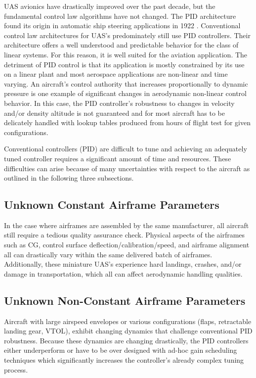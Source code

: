 \ac{UAS} avionics have drastically improved over the past decade, but the fundamental control law algorithms have not changed.  The \ac{PID} architecture found its origin in automatic ship steering applications in 1922 \cite{minorsky1922pid}.  Conventional control law architectures for \ac{UAS}'s predominately still use \ac{PID} controllers.  Their architecture offers a well understood and predictable behavior for the class of linear systems.  For this reason, it is well suited for the aviation application.  The detriment of \ac{PID} control is that its application is mostly constrained by its use on a linear plant and most aerospace applications are non-linear and time varying.   An aircraft's control authority that increases proportionally to dynamic pressure is one example of significant changes in aerodynamic non-linear control behavior.  In this case, the \ac{PID} controller's robustness to changes in velocity and/or density altitude is not guaranteed and for most aircraft has to be delicately handled with lookup tables produced from hours of flight test for given configurations.

Conventional controllers (\ac{PID}) are difficult to tune and achieving an adequately tuned controller requires a significant amount of time and resources.  These difficulties can arise because of many uncertainties with respect to the aircraft as outlined in the following three subsections.

\subsection{Unknown Constant Airframe Parameters}
In the case where airframes are assembled by the same manufacturer, all aircraft still require a tedious quality assurance check.  Physical aspects of the airframes such as \ac{CG}, control surface deflection/calibration/speed, and airframe alignment all can drastically vary within the same delivered batch of airframes.  Additionally, these miniature \ac{UAS}'s experience hard landings, crashes, and/or damage in transportation, which all can affect aerodynamic handling qualities.

\subsection{Unknown Non-Constant Airframe Parameters}
Aircraft with large airspeed envelopes or various configurations (flaps, retractable landing gear, \ac{VTOL}), exhibit changing dynamics that challenge conventional \ac{PID} robustness.  Because these dynamics are changing drastically, the \ac{PID} controllers either underperform or have to be over designed with ad-hoc gain scheduling techniques which significantly increases the controller's already complex tuning process.  

